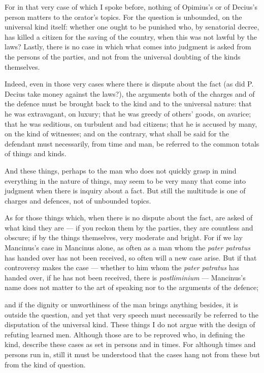 For in that very case of which I spoke before, nothing of Opimius's or of Decius's person matters to the orator's topics. For the question is unbounded, on the universal kind itself: whether one ought to be punished who, by senatorial decree, has killed a citizen for the saving of the country, when this was not lawful by the laws? Lastly, there is no case in which what comes into judgment is asked from the persons of the parties, and not from the universal doubting of the kinds themselves.

 Indeed, even in those very cases where there is dispute about the fact (as did P. Decius take money against the laws?), the arguments both of the charges and of the defence must be brought back to the kind and to the universal nature: that he was extravagant, on luxury; that he was greedy of others' goods, on avarice; that he was seditious, on turbulent and bad citizens; that he is accused by many, on the kind of witnesses; and on the contrary, what shall be said for the defendant must necessarily, from time and man, be referred to the common totals of things and kinds.

 And these things, perhaps to the man who does not quickly grasp in mind everything in the nature of things, may seem to be very many that come into judgment when there is inquiry about a fact. But still the multitude is one of charges and defences, not of unbounded topics.

 As for those things which, when there is no dispute about the fact, are asked of what kind they are — if you reckon them by the parties, they are countless and obscure; if by the things themselves, very moderate and bright. For if we lay Mancinus's case in Mancinus alone, as often as a man whom the \textit{pater patratus} has handed over has not been received, so often will a new case arise. But if that controversy makes the case — whether to him whom the \textit{pater patratus} has handed over, if he has not been received, there is \textit{postliminium} — Mancinus's name does not matter to the art of speaking nor to the arguments of the defence;

 and if the dignity or unworthiness of the man brings anything besides, it is outside the question, and yet that very speech must necessarily be referred to the disputation of the universal kind. These things I do not argue with the design of refuting learned men. Although those are to be reproved who, in defining the kind, describe these cases as set in persons and in times. For although times and persons run in, still it must be understood that the cases hang not from these but from the kind of question.


